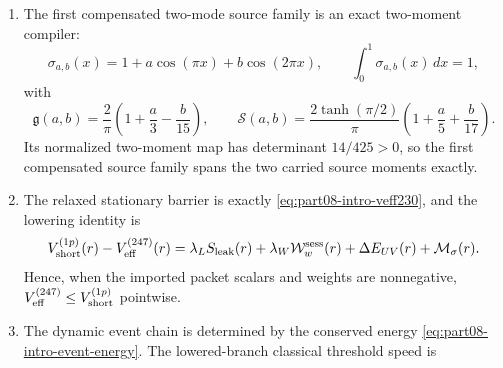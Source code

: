 \begin{theorem}
\begin{enumerate}[leftmargin=2.2em]
  \begin{equation}
  \label{eq:part08-main-uv-chart}
  U=\ln\frac{\mathcal T^2}{\mathcal T_{\rm ref}^2},
  \qquad
  V=\ln\frac{\epsilon_\eta}{\epsilon_{\eta,{\rm ref}}}.
  \end{equation}
  With
  \begin{equation}
  \label{eq:part08-main-delta-uv}
  \Delta_{UV}=a_Ua_V-\chi_{UV}^{2},
  \end{equation}
  the stationary point is
  \begin{equation}
  \label{eq:part08-main-uv-stationary}
  U=\frac{a_Vf_U}{\Delta_{UV}},
  \qquad
  V=\frac{\chi_{UV}f_U}{\Delta_{UV}},
  \qquad
  \Delta_{UV}>0.
  \end{equation}
  The corresponding drain is nonnegative:
  \begin{equation}
  \label{eq:part08-main-uv-drain}
  \mathcal D_{UV}=\frac{\chi_{UV}^{2}a_Vf_U^2}{\Delta_{UV}^{2}}\ge 0.
  \end{equation}
  \item The first compensated two-mode source family is an exact two-moment compiler:
  \begin{equation}
  \label{eq:part08-main-source-family}
  \sigma_{a,b}(x)=1+a\cos(\pi x)+b\cos(2\pi x),
  \qquad
  \int_0^1\sigma_{a,b}(x)\,dx=1,
  \end{equation}
  with
  \begin{equation}
  \label{eq:part08-main-source-moments}
  \mathfrak g(a,b)=\frac{2}{\pi}\left(1+\frac{a}{3}-\frac{b}{15}\right),
  \qquad
  \mathcal S(a,b)=\frac{2\tanh(\pi/2)}{\pi}\left(1+\frac{a}{5}+\frac{b}{17}\right).
  \end{equation}
  Its normalized two-moment map has determinant \(14/425>0\), so the first compensated source family spans the two carried source moments exactly.
  \item The relaxed stationary barrier is exactly \cref{eq:part08-intro-veff230}, and the lowering identity is
  \begin{equation}
  \label{eq:part08-main-lowering-identity}
  V_{\rm short}^{(1p)}(r)-V_{\rm eff}^{(247)}(r)
  =
  \lambda_LS_{\rm leak}(r)
  +\lambda_W\mathcal W_w^{\rm sess}(r)
  +\Delta E_{UV}(r)
  +\mathcal M_\sigma(r).
  \end{equation}
  Hence, when the imported packet scalars and weights are nonnegative, \(V_{\rm eff}^{(247)}\le V_{\rm short}^{(1p)}\) pointwise.
  \item The dynamic event chain is determined by the conserved energy \cref{eq:part08-intro-event-energy}.  The lowered-branch classical threshold speed is

\end{enumerate}
\end{theorem}
